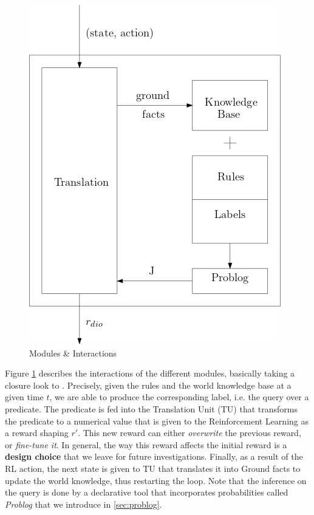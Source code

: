 \begin{figure}[H]
  \centering
  \includegraphics[scale=0.55]{figures/dynamics.png}
  \caption{Modules \& Interactions}
  \label{fig:mods}
\end{figure}

Figure \ref{fig:mods} describes the interactions of the different modules, basically taking a closure look to \dio{}. Precisely, 
given the rules and the world knowledge base at a given time $t$, we are able 
to produce the corresponding label, i.e. the query over a predicate. The predicate is fed 
into the Translation Unit (TU) that transforms the predicate to a numerical value that is given to the Reinforcement Learning 
as a reward shaping $r'$. This new reward can either \emph{overwrite} the previous reward, or \emph{fine-tune it}. In general, 
the way this reward affects the initial reward is a \textbf{design choice} that we leave for future investigations. 
Finally, as a result of the RL action, the next state is given 
to TU that translates it into Ground facts to update the world
knowledge, thus restarting the loop. Note that the inference on the query is done by a declarative tool that incorporates 
probabilities called \emph{Problog} that we introduce in \ref{sec:problog}.


